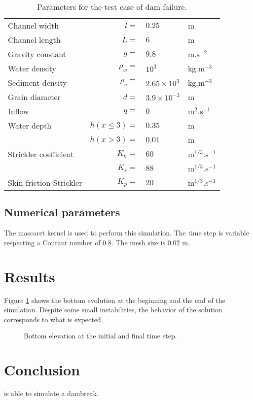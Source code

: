 \begin{table}[h]
\begin{center}
\begin{tabular}{l r l l}
  \hline
  Channel width             & $l=$               &$0.25$              &m \\
  Channel length            & $L=$               &$6$                 &m \\
  \hline
  Gravity constant  & $g=$             &$9.8$               &m.s$^{-2}$ \\
  Water density             & $\rho_w=$          &$10^3$              &kg.m$^{-3}$ \\
  Sediment density          & $\rho_s=$          &$2.65\times10^3$    &kg.m$^{-3}$ \\
  Grain diameter            & $d=$               &$3.9\times10^{-3}$  &m \\
  \hline
  \hline
  Inflow            &$q=$                &$0$                 & m$^2$.s$^{-1}$ \\
  Water depth                &$h(x \leqslant 3)=$ &$0.35$              & m  \\
                               &$h(x>3)=$           &$0.01$              & m  \\
  \hline
  \hline
  Strickler coefficient & $K_h=$  & $60$  & m$^{1/3}$.s$^{-1}$ \\
                           & $K_s=$  & $88$  & m$^{1/3}$.s$^{-1}$ \\
  Skin friction Strickler      & $K_p=$  & $20$  & m$^{1/3}$.s$^{-1}$ \\
  \hline
\end{tabular}
\caption{\label{paramDambreak} Parameters for the test case of dam failure.}
\end{center}
\end{table}

\subsection{Numerical parameters}

The mascaret kernel is used to perform this simulation. The time step 
is variable respecting a Courant number of 0.8. The mesh size is 0.02 
m.

\section{Results}

Figure \ref{fig:dambreak:results} shows the bottom evolution at the
beginning and the end of the simulation. Despite some small
instabilities, the behavior of the solution corresponds to what 
is expected.

\begin{figure}[h]
 \centering
 \caption{Bottom elevation at the initial and final time step.}
 \label{fig:dambreak:results}
\end{figure}

\section{Conclusion}

\courlis is able to simulate a dambreak.



